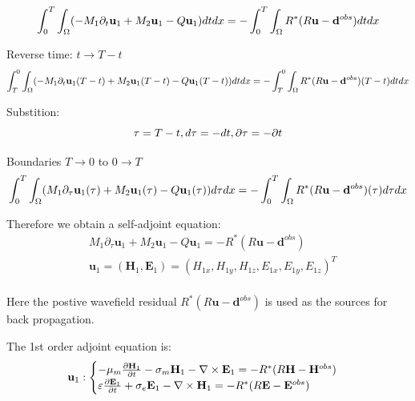 \documentclass[pdftex,a4paper,parskip,listof=totoc,bibliography=totoc,onehalfspacing,12pt]{scrreprt}
\begin{document}
\begin{equation}
 \int_0^T \int_\Omega (-M_1 \partial_{t} \mathbf{u}_{1}  + M_2 \mathbf{u}_{1} - Q \mathbf{u}_{1})  dt dx = -\int_0^T \int_\Omega R^{*}(R\mathbf{u} - \mathbf{d}^{obs}) dt dx\\
\end{equation}
\par Reverse time: $t \to T-t$
\begin{equation}
 \int_T^0 \int_\Omega (-M_1 \partial_{t} \mathbf{u}_{1}(T-t)  + M_2 \mathbf{u}_{1}(T-t) - Q \mathbf{u}_{1}(T-t) )  dt dx = -\int_T^0 \int_\Omega R^{*}(R\mathbf{u} - \mathbf{d}^{obs})(T-t) dt dx\\
\end{equation}
\par Substition: 
\begin{equation}
 \tau = T - t, d\tau = -dt, \partial \tau = -\partial t\\
\end{equation}
\par Boundaries $T \to 0$ to $0 \to T$
\begin{equation}
 \int_0^T \int_\Omega (M_1 \partial_{\tau} \mathbf{u}_{1}(\tau) + M_2 \mathbf{u}_{1}(\tau) - Q \mathbf{u}_{1}(\tau) )  d\tau dx = -\int_0^T \int_\Omega R^{*}(R\mathbf{u} - \mathbf{d}^{obs})(\tau) d\tau dx\\
\end{equation}
\par Therefore we obtain a self-adjoint equation:
\begin{equation}
\begin{align*}
\label{eqn:AdjointEquation1}
& M_1 \partial_{\tau} \mathbf{u}_{1} + M_2 \mathbf{u}_{1} - Q \mathbf{u}_{1} =  - R^{*}(R\mathbf{u} - \mathbf{d}^{obs})  \\
& \mathbf{u}_{1} = ( \mathbf{H}_{1}, \mathbf{E}_{1}) = (H_{1x}, H_{1y}, H_{1z}, E_{1x}, E_{1y}, E_{1z})^T  \\ 
\end{align*}
\end{equation}
\par Here the postive wavefield residual $R^{*}(R\mathbf{u} - \mathbf{d}^{obs}) $ is used as the sources for back propagation. \\
\par The 1st order adjoint equation is:
\begin{equation}
\label{eqn:AdjointEquation11}
\mathbf{u}_{1}:
\begin{cases}
-\mu_{m} \pdv{\mathbf{H}_{1}}{t} - \sigma_{m}\mathbf{H}_{1} - \nabla \times\mathbf{E}_{1} =  -R^{*}(R\mathbf{H} - \mathbf{H}^{obs}) \\
\varepsilon\pdv{\mathbf{E}_{1}}{t} + \sigma_{e}\mathbf{E}_{1} -\nabla \times \mathbf{H}_{1} =  - R^{*}(R\mathbf{E} - \mathbf{E}^{obs})
\end{cases}
\end{equation}
\end{document}
